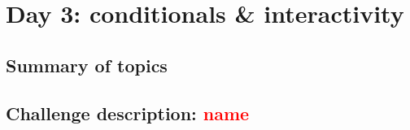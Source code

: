 \chapter{Day 3: conditionals \& interactivity}

\section{Summary of topics}

\section{Challenge description: \textcolor{red}{name}}
